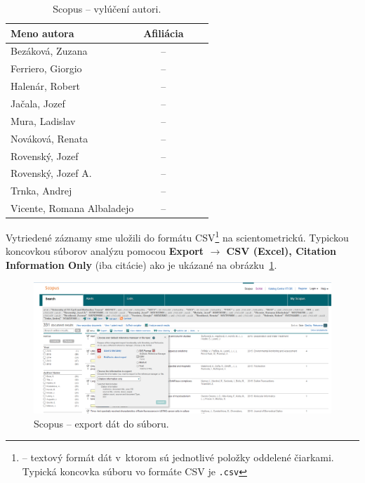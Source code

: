 \begin{table}
\centering\small
\begin{tabular}{lccc}
  \hline\noalign{\vspace{.3ex}}
  Meno autora                & Afiliácia \\[0.3ex]
  \hline\noalign{\vspace{.5ex}}
  Bezáková, Zuzana           & -- \\
  Ferriero, Giorgio          & -- \\
  Halenár, Robert            & -- \\
  Jačala, Jozef              & -- \\
  Mura, Ladislav             & -- \\[1ex]
  Nováková, Renata           & -- \\
  Rovenský, Jozef            & -- \\
  Rovenský, Jozef A.         & -- \\
  Trnka, Andrej              & -- \\
  Vicente, Romana Albaladejo & -- \\[0.5ex]
  \hline
\end{tabular}
\caption{Scopus -- vylúčení autori.}
\label{tab:scopus.exauthors}
\end{table}

Vytriedené záznamy sme uložili do formátu CSV\footnote{ -- textový formát dát v~ktorom sú jednotlivé položky oddelené
  čiarkami.  Typická koncovka súboru vo formáte CSV je \texttt{.csv}} na
scientometrickú.  Typickou koncovkou súborov analýzu pomocou \textbf{Export
  $\rightarrow$ CSV (Excel), Citation Information Only} (iba citácie) ako je
ukázané na obrázku~\ref{fig:scopus.export}.

\begin{figure}
  \centering
  \includegraphics[width=\textwidth]{obr/scopus10-cut.jpg}
  \caption{Scopus -- export dát do súboru.}
  \label{fig:scopus.export}
\end{figure}


